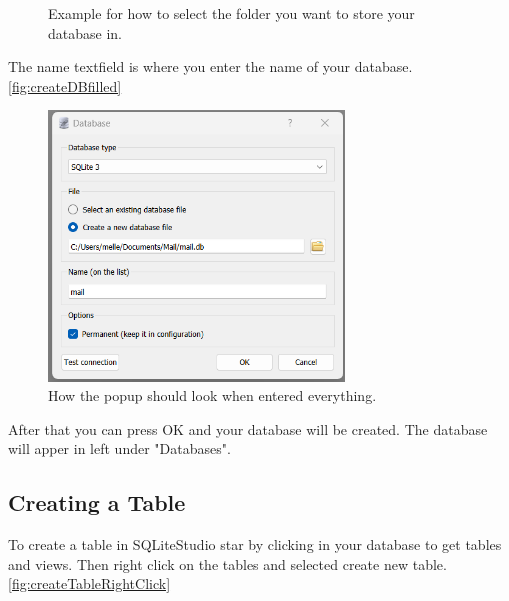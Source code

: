 \documentclass[a4paper,11pt,oneside]{article}
\begin{document}
\begin{sloppypar}
\begin{figure}[!htb]
  \caption{Example for how to select the folder you want to store your database in.}
  \label{fig:createDBnavigate}
\end{figure}
The name textfield is where you enter the name of your database. \autoref{fig:createDBfilled}
\begin{figure}[!htb]
  \centering
  \includegraphics[width=0.7\textwidth]{sqlitestudio/create_database/create_database_populated.png}
  \caption{How the popup should look when entered everything.}
  \label{fig:createDBfilled}
\end{figure}
After that you can press OK and your database will be created. The database will apper in left under "Databases".

\subsection{Creating a Table}
\label{sqliteStudioCreatingTable}
To create a table in SQLiteStudio star by clicking in your database to get tables and views. Then right click on the tables and selected create new table.\autoref{fig:createTableRightClick}


\end{sloppypar}
\end{document}
